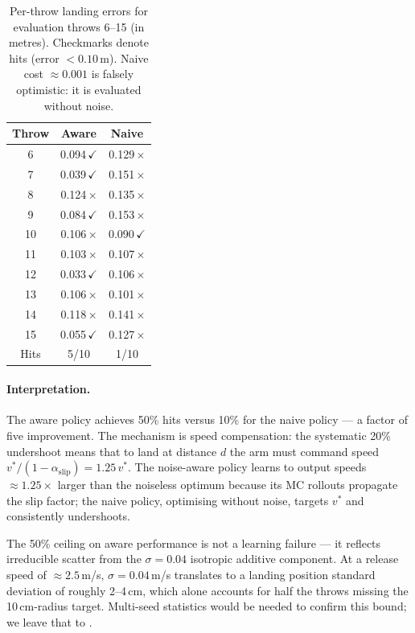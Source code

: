 \begin{table}[t]
  \centering
  \caption{Per-throw landing errors for evaluation throws 6–15 (in metres).
           Checkmarks denote hits (error $< 0.10$\,m). Naive cost $\approx 0.001$
           is falsely optimistic: it is evaluated without noise.}
  \label{tab:noise_pershot}
  \small
  \begin{tabular}{ccc}
    \toprule
    Throw & Aware & Naive \\
    \midrule
    6  & 0.094\,$\checkmark$ & 0.129\,$\times$ \\
    7  & 0.039\,$\checkmark$ & 0.151\,$\times$ \\
    8  & 0.124\,$\times$     & 0.135\,$\times$ \\
    9  & 0.084\,$\checkmark$ & 0.153\,$\times$ \\
    10 & 0.106\,$\times$     & 0.090\,$\checkmark$ \\
    11 & 0.103\,$\times$     & 0.107\,$\times$ \\
    12 & 0.033\,$\checkmark$ & 0.106\,$\times$ \\
    13 & 0.106\,$\times$     & 0.101\,$\times$ \\
    14 & 0.118\,$\times$     & 0.141\,$\times$ \\
    15 & 0.055\,$\checkmark$ & 0.127\,$\times$ \\
    \midrule
    Hits & 5/10 & 1/10 \\
    \bottomrule
  \end{tabular}
\end{table}

\paragraph{Interpretation.}
The aware policy achieves 50\% hits versus 10\% for the naive policy — a factor of
five improvement.
The mechanism is speed compensation: the systematic 20\% undershoot means that to
land at distance $d$ the arm must command speed $v^* / (1 - \alpha_{\mathrm{slip}}) =
1.25\,v^*$.
The noise-aware policy learns to output speeds $\approx 1.25\times$ larger than the
noiseless optimum because its MC rollouts propagate the slip factor; the naive policy,
optimising without noise, targets $v^*$ and consistently undershoots.

The 50\% ceiling on aware performance is not a learning failure — it reflects
irreducible scatter from the $\sigma = 0.04$ isotropic additive component.
At a release speed of $\approx 2.5$\,m/s, $\sigma = 0.04$\,m/s translates to a
landing position standard deviation of roughly 2–4\,cm, which alone accounts for
half the throws missing the 10\,cm-radius target.
Multi-seed statistics would be needed to confirm this bound; we leave that
to .

